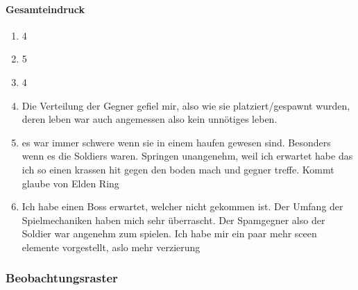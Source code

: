 \documentclass[../Main.tex]{subfiles}
\begin{document}
\paragraph{Gesamteindruck}
\begin{enumerate}[label=\textbf{Q\arabic*}, leftmargin=1.5cm, itemsep=0.8em, resume]
    \item 4
    \item 5
    \item 4
    \item Die Verteilung der Gegner gefiel mir, also wie sie platziert/gespawnt wurden, deren leben war auch angemessen also kein unnötiges leben.
    \item es war immer schwere wenn sie in einem haufen gewesen sind. Besonders wenn es die Soldiers waren. Springen unangenehm, weil ich erwartet habe das ich so einen krassen hit gegen den boden mach und gegner treffe. Kommt glaube von Elden Ring
    \item Ich habe einen Boss erwartet, welcher nicht gekommen ist. Der Umfang der Spielmechaniken haben mich sehr überrascht. Der Spamgegner also der Soldier war angenehm zum spielen. Ich habe mir ein paar mehr sceen elemente vorgestellt, aslo mehr verzierung
\end{enumerate}

\subsubsection{Beobachtungsraster}
\end{document}
